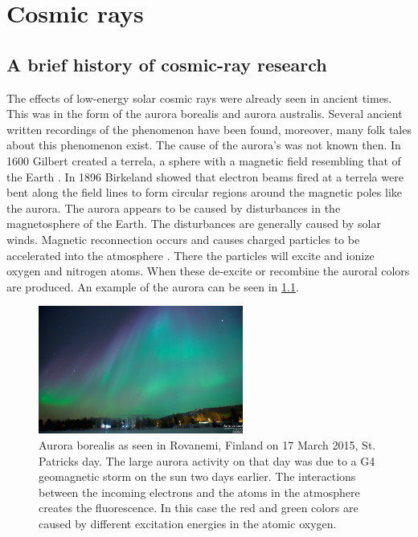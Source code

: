 \chapter{Cosmic rays}
\label{ch:cosmic-rays}


\section{A brief history of cosmic-ray research}


The effects of low-energy solar cosmic rays were already seen in ancient times. This was in the form of the aurora borealis and aurora australis. Several ancient written recordings of the phenomenon \cite{stephenson2004aurora} have been found, moreover, many folk tales about this phenomenon exist. The cause of the aurora's was not known then. In 1600 Gilbert created a terrela, a sphere with a magnetic field resembling that of the Earth \cite{gilbert1893terrela}. In 1896 Birkeland \cite{birkeland1896aurora} showed that electron beams fired at a terrela were bent along the field lines to form circular regions around the magnetic poles like the aurora. The aurora appears to be caused by disturbances in the magnetosphere of the Earth. The disturbances are generally caused by solar winds. Magnetic reconnection occurs and causes charged particles to be accelerated into the atmosphere \cite{angelopoulos2008reconnection}. There the particles will excite and ionize oxygen and nitrogen atoms. When these de-excite or recombine the auroral colors are produced. An example of the aurora can be seen in \cref{fig:aurora}.

\begin{figure}
    \centering
    \includegraphics[width=0.6\textwidth]{plots/cosmic-rays/aurora.png}
    \caption{Aurora borealis as seen in Rovanemi, Finland on 17 March 2015, St. Patricks day. The large aurora activity on that day was due to a G4 geomagnetic storm on the sun two days earlier. The interactions between the incoming electrons and the atoms in the atmosphere creates the fluorescence. In this case the red and green colors are caused by different excitation energies in the atomic oxygen.}
    \label{fig:aurora}
\end{figure}

